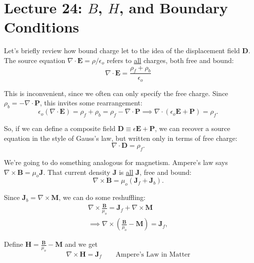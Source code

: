 \documentclass{article}
\numberwithin{equation}{section}
\begin{document}
\newpage

\section*{Lecture 24: $B$, $H$, and Boundary Conditions}
\setcounter{page}{1}

Let's briefly review how bound charge let to the idea of the displacement field $\bm{D}$. \\

The source equation $\nabla \cdot \bm{E} = \rho/\epsilon_o$ refers to \underline{all} charges, both free and bound:
\begin{equation*}
    \nabla \cdot \bm{E} = \frac{\rho_f + \rho_b}{\epsilon_o}
\end{equation*}

This is inconvenient, since we often can only specify the free charge. Since $\rho_b = -\nabla \cdot \bm{P}$, this invites some rearrangement:
\begin{equation*}
    \epsilon_o \left( \nabla \cdot \bm{E} \right) = \rho_f + \rho_b = \rho_f - \nabla \cdot \bm{P} \implies \nabla \cdot \left( \epsilon_o \bm{E} + \bm{P} \right) = \rho_f.
\end{equation*}

So, if we can define a composite field $\bm{D} \equiv \epsilon \bm{E} + \bm{P}$, we can recover a source equation in the style of Gauss's law, but written only in terms of free charge:
\begin{equation*}
    \nabla \cdot \bm{D} = \rho_f.
\end{equation*}

We're going to do something analogous for magnetism. Ampere's law says $\nabla \times \bm{B} = \mu_o \bm{J}$. That current density $\bm{J}$ is \underline{all} $\bm{J}$, free and bound:
\begin{equation*}
    \nabla \times \bm{B} = \mu_o \left( \bm{J}_f + \bm{J}_b \right).
\end{equation*}

Since $\bm{J}_b = \nabla \times \bm{M}$, we can do some reshuffling:
\begin{gather*}
    \nabla \times \frac{\bm{B}}{\mu_o} = \bm{J}_f + \nabla \times \bm{M} \\
    \implies \nabla \times \left( \frac{\bm{B}}{\mu_o} - \bm{M} \right) = \bm{J}_f,
\end{gather*}

Define $\bm{H} = \frac{\bm{B}}{\mu_o} - \bm{M}$ and we get
\begin{equation*}
    \boxed{\nabla \times \bm{H} = \bm{J}_f} \qquad \text{Ampere's Law in Matter}
\end{equation*}
\end{document}
